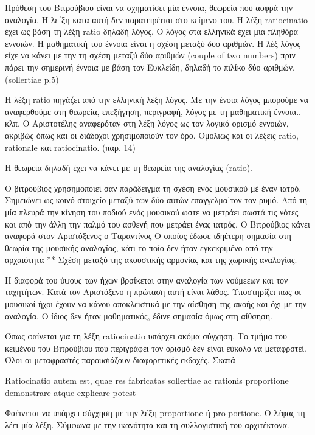 Πρόθεση του Βιτρούβιου είναι να σχηματίσει μία έννοια, θεωρεία που αοφρά την
αναλογία. Η λε΄ξη κατα αυτή δεν παρατειρέιται στο κείμενο του. Η λέξη
ratiocinatio έχει ως βάση τη λέξη ratio δηλαδή λόγος. Ο λόγος στα ελληνικά έχει
μια πληθόρα εννοιών. Η μαθηματική του έννοια είναι η σχέση μεταξύ δυο αριθμών. Η
λέξ λόγος είχε να κάνει με την τη σχέση μεταξύ δύο αριθμών (couple of two
numbers) πριν πάρει την σημερινή έννοια με βάση τον Ευκλείδη, δηλαδή το πιλίκο
δύο αριθμών. (sollertiae p.5)

Η λέξη ratio πηγάζει από την ελληνική λέξη λόγος. Με την ένοια λόγος μπορούμε
να αναφερθούμε στη θεωρεία, επεξήγηση, περιγραφή, λόγος με τη μαθηματική
έννοια.. κλπ. Ο Αριστοτέλης αναφερόταν στη λέξη λόγος ως τον λογικό ορισμό
εννοιών, ακριβώς όπως και οι διάδοχοι χρησιμοποιούν τον όρο. Ομολιως και οι
λέξεις ratio, rationale και ratiocinatio. (παρ. 14)

Η θεωρεία δηλαδή έχει να κάνει με τη θεωρεία της αναλογίας (ratio). 

Ο βιτρούβιος χρησημοποιεί σαν παράδειγμα τη σχέση ενός μουσικού μέ έναν ιατρό.
Σημειώνει ως κοινό στοιχείο μεταξύ των δύο αυτών επαγγελμα΄τον τον ρυμό. Από τη
μία πλευρά την κίνηση του ποδιού ενός μουσικού ωστε να μετράει σωστά τις νότες
και από την άλλη την παλμό του ασθενή που μετράει ένας ιατρός. Ο Βιτρούβιος
κάνει αναφορά στον Αριστόξενος ο Ταραντίνος Ο οποίος έδωσε ιδηέτερη σημασία στη
θεωρία της μουσικής αναλογίας, κάτι το ποίο δεν ήταν εγκεκριμένο από την
αρχαιότητα ** Σχέση μεταξύ της ακουστικής αρμονίας και της χωρικής αναλογίας. 

Η διαφορά του ύψους των ήχων βρσίκεται στην αναλογία των νούμεεων και τον
ταχητήτων. Κατά τον Αριστόξενο η πρώταση αυτή είναι λάθος. Υποστηρίζει πως οι
μουσικοί ήχοι έχουν να κάνου αποκλειστικά με την αίσθηση της ακοής και όχι με
την αναλογία. Ο ίδιος δεν ήταν μαθηματικός, έδινε σημασία όμως στη αίθσηση. 

Όπως φαίνεται για τη λέξη ratiocinatio υπάρχει ακόμα σύγχηση. Το τμήμα του
κειμένου του Βιτρούβιου που περιγράφει τον ορισμό δεν είναι εύκολο να
μεταφρστεί. Όλοι οι μεταφραστές παρουσιάζουν διαφορετικές εκδοχές. Σκατά

Ratiocinatio autem est, quae res fabricatas sollertiae ac rationis proportione
demonstrare atque explicare potest

Φαέινεται να υπάρχει σύγχηση με την λέξη proportione ή pro portione. Ο λέφας
τη λέει μία λέξη. 
Σύμφωνα με την ικανότητα και τη συλλογιστική του αρχιτέκτονα.


